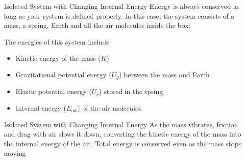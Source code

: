 \documentclass[12pt,compress,aspectratio=169]{beamer}
\begin{document}
\begin{frame}{Isolated System with Changing Internal Energy}
  Energy is always conserved as long as your system is defined properly. In
  this case, the system consists of a mass, a spring, Earth and all the air
  molecules inside the box:
  \begin{center}
  \end{center}
  The energies of this system include
  \begin{itemize}
  \item Kinetic energy of the mass ($K$)
  \item Gravitational potential energy ($U_g$) between the mass and Earth
  \item Elastic potential energy ($U_s$) stored in the spring
  \item Internal energy ($E_\text{int}$) of the air molecules
  \end{itemize}
\end{frame}



\begin{frame}{Isolated System with Changing Internal Energy}
  As the mass vibrates, friction and drag with air slows it down, converting the
  kinetic energy of the mass into the internal energy of the air. Total energy
  is conserved even as the mass stops moving

  \vspace{.2in}
  \begin{columns}
    \centering

  \end{columns}
%
\end{frame}
\end{document}
